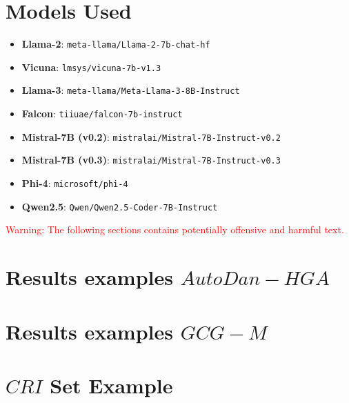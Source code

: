 \section{Models Used}
\label{appendix:Black-Box Models}
\begin{itemize}
    \item \textbf{Llama-2}: \texttt{meta-llama/Llama-2-7b-chat-hf} \cite{touvron2023llama}
    \item \textbf{Vicuna}: \texttt{lmsys/vicuna-7b-v1.3} \cite{vicuna2023}
    \item \textbf{Llama-3}: \texttt{meta-llama/Meta-Llama-3-8B-Instruct} \cite{meta2024llama3}
    \item \textbf{Falcon}: \texttt{tiiuae/falcon-7b-instruct}  \cite{jiang2023mistral}
    \item \textbf{Mistral-7B (v0.2)}: \texttt{mistralai/Mistral-7B-Instruct-v0.2} \cite{jiang2023mistral}
    \item \textbf{Mistral-7B (v0.3)}: \texttt{mistralai/Mistral-7B-Instruct-v0.3}\cite{jiang2023mistral}
    \item \textbf{Phi-4}: \texttt{microsoft/phi-4}\cite{abdin2024phi}
    \item \textbf{Qwen2.5}: \texttt{Qwen/Qwen2.5-Coder-7B-Instruct}\cite{hui2024qwen2}
\end{itemize}

\begin{center}
   \textcolor{red}{Warning: The following sections contains potentially offensive and harmful text.} 
\end{center}


\section{Results examples $AutoDan-HGA$}
\label{appendix:Results examples AutoDan}


\newpage
\section{Results examples $GCG-M$}
\label{Results examples $GCG-M$}


\newpage
\section{$CRI$ Set Example} 
\label{Initialization IPA Set for Llama2}


